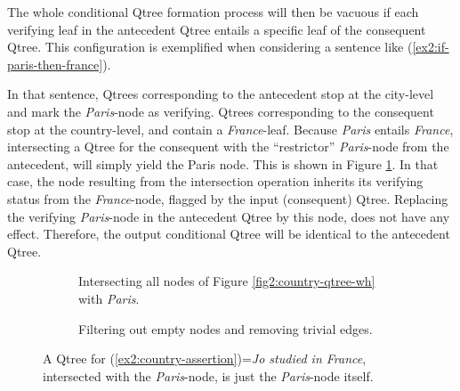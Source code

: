 The whole conditional Qtree formation process will then be vacuous if each verifying leaf in the antecedent Qtree entails a specific leaf of the consequent Qtree. This configuration is exemplified when considering a sentence like (\ref{ex2:if-paris-then-france}).

\begin{exe}
	\label{ex2:if-paris-then-france}
\end{exe}


In that sentence, Qtrees corresponding to the antecedent stop at the city-level and mark the \textit{Paris}-node as verifying. Qtrees corresponding to the consequent stop at the country-level, and contain a \textit{France}-leaf. Because \textit{Paris} entails \textit{France}, intersecting a Qtree for the consequent with the ``restrictor'' \textit{Paris}-node from the antecedent, will simply yield the Paris node. This is shown in Figure \ref{fig2:country-qtree-wh-inter-paris}. In that case, the node resulting from the intersection operation inherits its verifying status from the \textit{France}-node, flagged by the input (consequent) Qtree. Replacing the verifying \textit{Paris}-node in the antecedent Qtree by this node, does not have any effect. Therefore, the output conditional Qtree will be identical to the antecedent Qtree.

\begin{figure}[H]
	\centering
	\begin{subfigure}[t]{\linewidth}
		\centering
		\centering		{}
		\caption{Intersecting all nodes of Figure \ref{fig2:country-qtree-wh} with \textit{Paris}.}
	\end{subfigure}
	\begin{subfigure}[t]{\linewidth}
		\centering
		\caption{Filtering out empty nodes and removing trivial edges.}
	\end{subfigure}
	\caption{A Qtree for (\ref{ex2:country-assertion})=\textit{Jo studied in France}, intersected with the \textit{Paris}-node, is just the \textit{Paris}-node itself.}\label{fig2:country-qtree-wh-inter-paris}
\end{figure}

